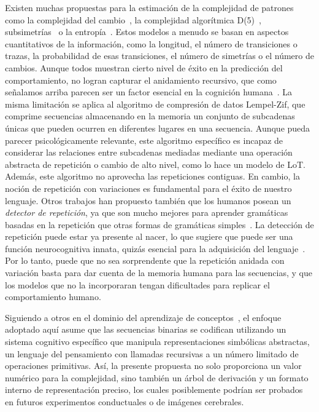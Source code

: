 Existen muchas propuestas para la estimación de la complejidad de patrones como la complejidad del cambio~\cite{f47}, la complejidad algorítmica D(5)~\cite{f44,f45,f46}, subsimetrías~\cite{f94} o la entropía~\cite{f34,f96,f97,f98,f111}. Estos modelos a menudo se basan en aspectos cuantitativos de la información, como la longitud, el número de transiciones o trazas, la probabilidad de esas transiciones, el número de simetrías o el número de cambios. Aunque todos muestran cierto nivel de éxito en la predicción del comportamiento, no logran capturar el anidamiento recursivo, que como señalamos arriba parecen ser un factor esencial en la cognición humana~\cite{f4,f6}. La misma limitación se aplica al algoritmo de compresión de datos Lempel-Zif, que comprime secuencias almacenando en la memoria un conjunto de subcadenas únicas que pueden ocurren en diferentes lugares en una secuencia. Aunque pueda parecer psicológicamente relevante, este algoritmo específico es incapaz de considerar las relaciones entre subcadenas mediadas mediante una operación abstracta de repetición o cambio de alto nivel, como lo hace un modelo de LoT. Además, este algoritmo no aprovecha las repeticiones contiguas. En cambio, la noción de repetición con variaciones es fundamental para el éxito de nuestro lenguaje. Otros trabajos han propuesto también que los humanos posean un \textit{detector de repetición}, ya que son mucho mejores para aprender gramáticas basadas en la repetición que otras formas de gramáticas simples~\cite{f113}. La detección de repetición puede estar ya presente al nacer, lo que sugiere que puede ser una función neurocognitiva innata, quizás esencial para la adquisición del lenguaje~\cite{f114}. Por lo tanto, puede que no sea sorprendente que la repetición anidada con variación basta para dar cuenta de la memoria humana para las secuencias, y que los modelos que no la incorporaran tengan dificultades para replicar el comportamiento humano.


Siguiendo a otros en el dominio del aprendizaje de conceptos~\cite{piantadosi2012bootstrapping,piantadosi2016logical}, el enfoque adoptado aquí asume que las secuencias binarias se codifican utilizando un sistema cognitivo específico que manipula representaciones simbólicas abstractas, un lenguaje del pensamiento con llamadas recursivas a un número limitado de operaciones primitivas. Así, la presente propuesta no solo proporciona un valor numérico para la complejidad, sino también un árbol de derivación y un formato interno de representación preciso, los cuales posiblemente podrían ser probados en futuros experimentos conductuales o de imágenes cerebrales.

